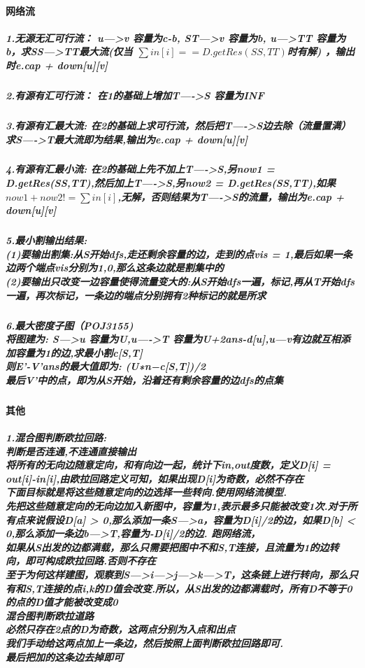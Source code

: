 \documentclass{article}
\begin{document}
\paragraph{网络流}
\subparagraph{1.无源无汇可行流： u--->v 容量为c-b, ST--->v 容量为b, u--->TT 容量为b，求SS--->TT最大流(仅当 $\sum in[i] == D.getRes(SS,TT)$时有解) ，输出时e.cap + down[u][v]}
\subparagraph{2.有源有汇可行流： 在1的基础上增加T---->S 容量为INF}
\subparagraph{3.有源有汇最大流: 在2的基础上求可行流，然后把T---->S边去除（流量置满） 求S---->T最大流即为结果,输出为e.cap + down[u][v]}
\subparagraph{4.有源有汇最小流: 在2的基础上先不加上T---->S,另now1 = D.getRes(SS,TT),然后加上T---->S,另now2 = D.getRes(SS,TT),如果$now1 + now2 != \sum in[i]$,无解，否则结果为T---->S的流量，输出为e.cap + down[u][v]}
\subparagraph{5.最小割输出结果: \\
(1)要输出割集:从S开始dfs,走还剩余容量的边，走到的点vis = 1,最后如果一条边两个端点vis分别为1,0,那么这条边就是割集中的 \\
(2)要输出只改变一边容量使得流量变大的:从S开始dfs一遍，标记,再从T开始dfs一遍，再次标记，一条边的端点分别拥有2种标记的就是所求}
\subparagraph{6.最大密度子图（POJ3155)　\\
将图建为: S—>u 容量为U,u—->T 容量为U+2ans-d[u],u—v有边就互相添加容量为1的边,求最小割c[S,T] \\
则E’-V’ans的最大值即为: (U∗n−c[S,T])/2 \\
最后V’中的点，即为从S开始，沿着还有剩余容量的边dfs的点集}
\paragraph{其他}
\subparagraph{1.混合图判断欧拉回路: \\
判断是否连通,不连通直接输出 \\
将所有的无向边随意定向，和有向边一起，统计下in,out度数，定义D[i] = out[i]-in[i],由欧拉回路定义可知，如果出现D[i]为奇数，必然不存在 \\
下面目标就是将这些随意定向的边选择一些转向.使用网络流模型.\\先把这些随意定向的无向边加入新图中，容量为1,表示最多只能被改变1次.对于所有点来说假设D[a] > 0,那么添加一条S—>a，容量为D[i]/2的边，如果D[b] < 0,那么添加一条边b—>T,容量为-D[i]/2的边. 跑网络流，\\如果从S出发的边都满载，那么只需要把图中不和S,T连接，且流量为1的边转向，即可构成欧拉回路.否则不存在\\
至于为何这样建图，观察到S—>i—>j—>k—>T，这条链上进行转向，那么只有和S,T连接的点i,k的D值会改变.所以，从S出发的边都满载时，所有D不等于0的点的D值才能被改变成0\\
混合图判断欧拉道路\\
必然只存在2点的D为奇数，这两点分别为入点和出点\\
我们手动给这两点加上一条边，然后按照上面判断欧拉回路即可.\\
最后把加的这条边去掉即可\\}
\end{document}
